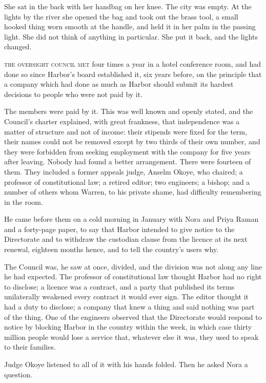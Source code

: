 She sat in the back with her handbag on her knee. The city was empty. At the lights by the river she opened the bag and took out the brass tool, a small hooked thing worn smooth at the handle, and held it in her palm in the passing light. She did not think of anything in particular. She put it back, and the lights changed.


\textsc{the oversight council met} four times a year in a hotel conference room, and had done so since Harbor's board established it, six years before, on the principle that a company which had done as much as Harbor should submit its hardest decisions to people who were not paid by it.

The members were paid by it. This was well known and openly stated, and the Council's charter explained, with great frankness, that independence was a matter of structure and not of income: their stipends were fixed for the term, their names could not be removed except by two thirds of their own number, and they were forbidden from seeking employment with the company for five years after leaving. Nobody had found a better arrangement. There were fourteen of them. They included a former appeals judge, Anselm Okoye, who chaired; a professor of constitutional law; a retired editor; two engineers; a bishop; and a number of others whom Warren, to his private shame, had difficulty remembering in the room.

He came before them on a cold morning in January with Nora and Priya Raman and a forty-page paper, to say that Harbor intended to give notice to the Directorate and to withdraw the custodian clause from the licence at its next renewal, eighteen months hence, and to tell the country's users why.

The Council was, he saw at once, divided, and the division was not along any line he had expected. The professor of constitutional law thought Harbor had no right to disclose; a licence was a contract, and a party that published its terms unilaterally weakened every contract it would ever sign. The editor thought it had a duty to disclose; a company that knew a thing and said nothing was part of the thing. One of the engineers observed that the Directorate would respond to notice by blocking Harbor in the country within the week, in which case thirty million people would lose a service that, whatever else it was, they used to speak to their families.

Judge Okoye listened to all of it with his hands folded. Then he asked Nora a question.

